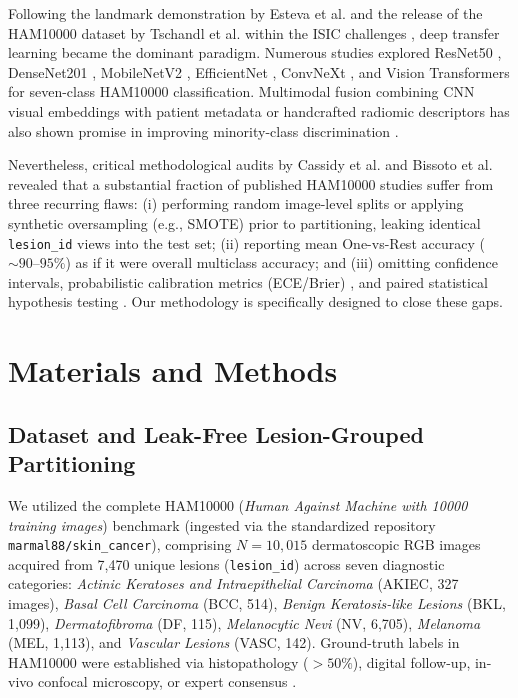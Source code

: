 \documentclass[11pt,a4paper]{article}
\begin{document}
Following the landmark demonstration by Esteva et al. \cite{esteva2017} and the release of the HAM10000 dataset by Tschandl et al. \cite{tschandl2018} within the ISIC challenges \cite{codella2019, tschandl2020}, deep transfer learning became the dominant paradigm. Numerous studies explored ResNet50 \cite{he2016}, DenseNet201 \cite{huang2017}, MobileNetV2 \cite{sandler2018}, EfficientNet \cite{tan2019, tan2021}, ConvNeXt \cite{liu2022}, and Vision Transformers \cite{dosovitskiy2021, aladhadh2022, xin2022} for seven-class HAM10000 classification. Multimodal fusion combining CNN visual embeddings with patient metadata or handcrafted radiomic descriptors has also shown promise in improving minority-class discrimination \cite{yap2018, pacheco2020, ningrum2021}.

Nevertheless, critical methodological audits by Cassidy et al. \cite{cassidy2022} and Bissoto et al. \cite{bissoto2020} revealed that a substantial fraction of published HAM10000 studies suffer from three recurring flaws: (i) performing random image-level splits or applying synthetic oversampling (e.g., SMOTE) prior to partitioning, leaking identical \texttt{lesion\_id} views into the test set; (ii) reporting mean One-vs-Rest accuracy ($\sim 90\text{--}95\%$) as if it were overall multiclass accuracy; and (iii) omitting confidence intervals, probabilistic calibration metrics (ECE/Brier) \cite{guo2017}, and paired statistical hypothesis testing \cite{demvsar2006}. Our methodology is specifically designed to close these gaps.

\section{Materials and Methods}

\subsection{Dataset and Leak-Free Lesion-Grouped Partitioning}
We utilized the complete HAM10000 (\textit{Human Against Machine with 10000 training images}) benchmark \cite{tschandl2018} (ingested via the standardized repository \texttt{marmal88/skin\_cancer}), comprising $N = 10,015$ dermatoscopic RGB images acquired from 7,470 unique lesions (\texttt{lesion\_id}) across seven diagnostic categories: \textit{Actinic Keratoses and Intraepithelial Carcinoma} (AKIEC, 327 images), \textit{Basal Cell Carcinoma} (BCC, 514), \textit{Benign Keratosis-like Lesions} (BKL, 1,099), \textit{Dermatofibroma} (DF, 115), \textit{Melanocytic Nevi} (NV, 6,705), \textit{Melanoma} (MEL, 1,113), and \textit{Vascular Lesions} (VASC, 142). Ground-truth labels in HAM10000 were established via histopathology ($>50\%$), digital follow-up, in-vivo confocal microscopy, or expert consensus \cite{tschandl2018}.
\end{document}
